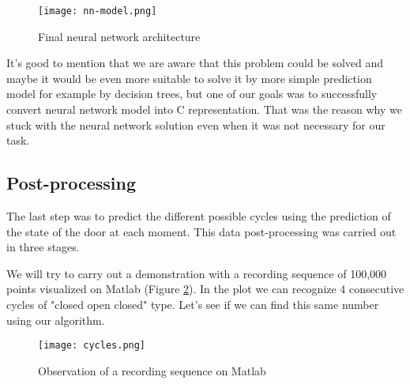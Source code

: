 \documentclass[12pt, letterpaper]{article}
\begin{document}
\begin{figure}[H]
    \centering
    \texttt{[image: nn-model.png]}
    \caption{Final neural network architecture}
    \label{fig:nn-model}
\end{figure}

It's good to mention that we are aware that this problem could be solved and maybe it would be even more suitable to solve it by more simple prediction model for example by decision trees, but one of our goals was to successfully convert neural network model into C representation. That was the reason why we stuck with the neural network solution even when it was not necessary for our task.

\newpage
\subsection{Post-processing}
The last step was to predict the different possible cycles using the prediction of the state of the door at each moment. This data post-processing was carried out in three stages.

We will try to carry out a demonstration with a recording sequence of 100,000 points visualized on Matlab (Figure \ref{fig:cycles}). In the plot we can recognize 4 consecutive cycles of "closed open closed" type. Let's see if we can find this same number using our algorithm.

\begin{figure}[H]
    \centering
    \texttt{[image: cycles.png]}
    \caption{Observation of a recording sequence on Matlab}
    \label{fig:cycles}
\end{figure}
\end{document}
